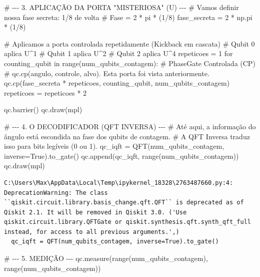 \documentclass[
  brazilian,
]{report}
\newenvironment{Shaded}{\begin{snugshade}}{\end{snugshade}}
\newcommand{\NormalTok}[1]{\textcolor[rgb]{0.00,0.23,0.31}{#1}}
\begin{document}
\begin{Shaded}
\begin{Highlighting}[]


\NormalTok{\# {-}{-}{-} 3. APLICAÇÃO DA PORTA "MISTERIOSA" (U) {-}{-}{-}}
\NormalTok{\# Vamos definir nossa fase secreta: 1/8 de volta}
\NormalTok{\# Fase = 2 * pi * (1/8)}
\NormalTok{fase\_secreta = 2 * np.pi * (1/8)}

\NormalTok{\# Aplicamos a porta controlada repetidamente (Kickback em cascata)}
\NormalTok{\# Qubit 0 aplica U\^{}1}
\NormalTok{\# Qubit 1 aplica U\^{}2}
\NormalTok{\# Qubit 2 aplica U\^{}4}
\NormalTok{repeticoes = 1}
\NormalTok{for counting\_qubit in range(num\_qubits\_contagem):}
\NormalTok{    \# PhaseGate Controlada (CP)}
\NormalTok{    \# qc.cp(angulo, controle, alvo). Esta porta foi vista anteriormente.}
\NormalTok{    qc.cp(fase\_secreta * repeticoes, counting\_qubit, num\_qubits\_contagem)}
\NormalTok{    repeticoes = repeticoes * 2}

\NormalTok{qc.barrier()}
\NormalTok{qc.draw(\textquotesingle{}mpl\textquotesingle{})}
\end{Highlighting}
\end{Shaded}

\begin{Shaded}
\begin{Highlighting}[]


\NormalTok{\# {-}{-}{-} 4. O DECODIFICADOR (QFT INVERSA) {-}{-}{-}}
\NormalTok{\# Até aqui, a informação do ângulo está escondida na fase dos qubits de contagem.}
\NormalTok{\# A QFT Inversa traduz isso para bits legíveis (0 ou 1).}
\NormalTok{qc\_iqft = QFT(num\_qubits\_contagem, inverse=True).to\_gate()}
\NormalTok{qc.append(qc\_iqft, range(num\_qubits\_contagem))}
\NormalTok{qc.draw(\textquotesingle{}mpl\textquotesingle{})}
\end{Highlighting}
\end{Shaded}

\begin{verbatim}
C:\Users\Max\AppData\Local\Temp\ipykernel_18328\2763487660.py:4: DeprecationWarning: The class ``qiskit.circuit.library.basis_change.qft.QFT`` is deprecated as of Qiskit 2.1. It will be removed in Qiskit 3.0. ('Use qiskit.circuit.library.QFTGate or qiskit.synthesis.qft.synth_qft_full instead, for access to all previous arguments.',)
  qc_iqft = QFT(num_qubits_contagem, inverse=True).to_gate()
\end{verbatim}

\begin{Shaded}
\begin{Highlighting}[]


\NormalTok{\# {-}{-}{-} 5. MEDIÇÃO {-}{-}{-}}
\NormalTok{qc.measure(range(num\_qubits\_contagem), range(num\_qubits\_contagem))}
\end{Highlighting}
\end{Shaded}
\end{document}
